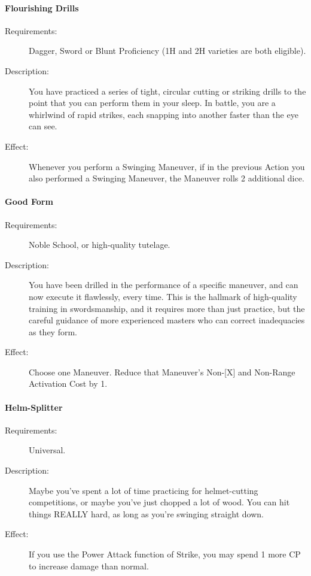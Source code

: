 \documentclass[oneside,11pt,english]{book}
\begin{document}
\paragraph{\label{talent:Flourishing Drills}Flourishing Drills}
	\begin{description}
		\item [Requirements:] Dagger, Sword or Blunt Proficiency (1H and 2H varieties are both eligible). 
		\item [Description:] You have practiced a series of tight, circular cutting or striking drills to the point that you can perform them in your sleep. In battle, you are a whirlwind of rapid strikes, each snapping into another faster than the eye can see. 
		\item [Effect:] Whenever you perform a Swinging Maneuver, if in the previous Action you also performed a Swinging Maneuver, the Maneuver rolls 2 additional dice. 
	\end{description}
	
\paragraph{\label{talent:Good Form}Good Form}
	\begin{description}
		\item [Requirements:] Noble School, or high-quality tutelage. 
		\item [Description:] You have been drilled in the performance of a specific maneuver, and can now execute it 
flawlessly, every time. This is the hallmark of high-quality training in swordsmanship, and it requires 
more than just practice, but the careful guidance of more experienced masters who can correct 
inadequacies as they form. 
		\item [Effect:] Choose one Maneuver. Reduce that Maneuver’s Non-[X] and Non-Range Activation Cost by 1. 

	\end{description}
\paragraph{\label{talent:Helm-Splitter}Helm-Splitter}
	\begin{description}
		\item [Requirements:] Universal. 
		\item [Description:] Maybe you've spent a lot of time practicing for helmet-cutting competitions, or maybe 
you've just chopped a lot of wood. You can hit things REALLY hard, as long as you’re swinging straight 
down. 
		\item [Effect:] If you use the Power Attack function of Strike, you may spend 1 more CP to increase damage 
than normal. 

	\end{description}
\end{document}
